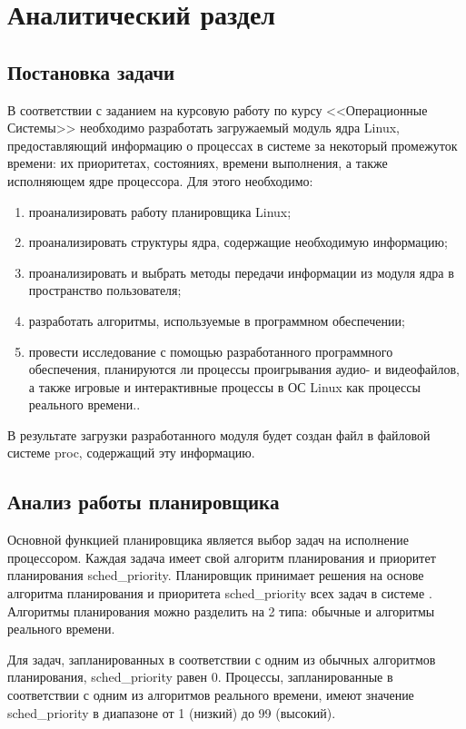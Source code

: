 \chapter{Аналитический раздел}


\section{Постановка задачи}
В соответствии с заданием на курсовую работу по курсу <<Операционные Системы>> необходимо разработать загружаемый модуль ядра Linux, предоставляющий информацию о процессах в системе за некоторый промежуток времени: их приоритетах, состояниях, времени выполнения, а также исполняющем ядре процессора. Для этого необходимо:

\begin{enumerate}
\item проанализировать работу планировщика Linux;
\item проанализировать структуры ядра, содержащие необходимую информацию;
\item проанализировать и выбрать методы передачи информации из модуля ядра в пространство пользователя;
\item разработать алгоритмы, используемые в программном обеспечении;
\item провести исследование с помощью разработанного программного обеспечения, планируются ли процессы проигрывания аудио- и видеофайлов, а также игровые и интерактивные процессы в ОС Linux как процессы реального времени..
\end{enumerate}

В результате загрузки разработанного модуля будет создан файл в файловой системе proc, содержащий эту информацию.


\section{Анализ работы планировщика}\label{descrsched}

Основной функцией планировщика является выбор задач на исполнение процессором. Каждая задача имеет свой алгоритм планирования и приоритет планирования sched\_priority. Планировщик принимает решения на основе алгоритма планирования и приоритета sched\_priority всех задач в системе \cite{bib:1}. Алгоритмы планирования можно разделить на 2 типа: обычные и алгоритмы реального времени.

Для задач, запланированных в соответствии с одним из обычных алгоритмов планирования, sched\_priority равен 0. Процессы, запланированные в соответствии с одним из алгоритмов реального времени, имеют значение sched\_priority в диапазоне от 1 (низкий) до 99 (высокий). 

